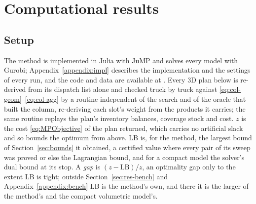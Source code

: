 \section{Computational results}
\label{sec:results}

\subsection{Setup}
\label{sec:res-setup}

The method is implemented in Julia with JuMP and solves every model
with Gurobi; Appendix~\ref{appendix:impl} describes the implementation
and the settings of every run, and the code and data are available at
. Every 3D plan below is re-derived
from its dispatch list alone and checked truck by truck against
\eqref{eq:col-geom}--\eqref{eq:col-agg} by a routine independent of
the search and of the oracle that built the column, re-deriving each
slot's weight from the products it carries; the same routine replays
the plan's inventory balances, coverage stock and cost.
$z$ is the cost \eqref{eq:MPObjective} of the plan returned, which
carries no artificial slack and so bounds the optimum from above. LB
is, for the method, the largest bound of Section~\ref{sec:bounds} it
obtained, a certified value where every pair of its sweep was proved
or else the Lagrangian bound, and for a compact model the solver's dual
bound at its stop. A \emph{gap} is $(z-\mathrm{LB})/z$, an optimality
gap only to the extent LB is tight; outside Section~\ref{sec:res-bench}
and Appendix~\ref{appendix:bench} LB is the method's own, and there it
is the larger of the method's and the compact volumetric model's.

